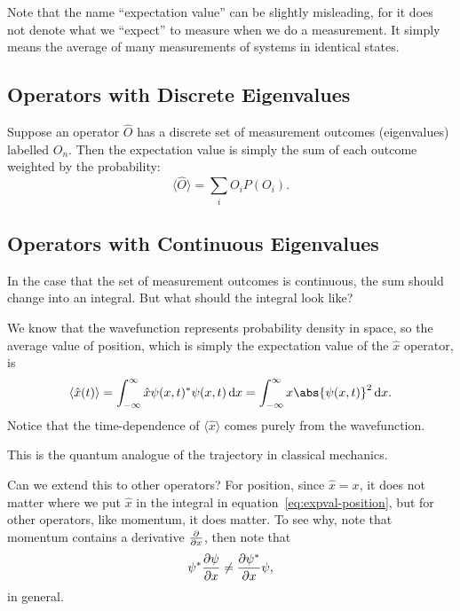 \documentclass[../quantum_mechanics.tex]{subfiles}
\begin{document}
        Note that the name ``expectation value'' can be slightly misleading, for it does not denote what we ``expect'' to measure when we do a measurement.
        It simply means the average of many measurements of systems in identical states.
        
        \subsection{Operators with Discrete Eigenvalues}\label{subsec:operators-with-discrete-eigenvalues}
            Suppose an operator $\hat{O}$ has a discrete set of measurement outcomes (eigenvalues) labelled $O_n$.
            Then the expectation value is simply the sum of each outcome weighted by the probability:
            \begin{equation}\label{eq:operator-expval-discrete}
                \langle\hat{O}\rangle=\sum_i O_i P(O_i).
            \end{equation}

        \subsection{Operators with Continuous Eigenvalues}\label{subsec:operators-with-continuous-eigenvalues}
            In the case that the set of measurement outcomes is continuous, the sum should change into an integral.
            But what should the integral look like?

            We know that the wavefunction represents probability density in space, so the average value of position, which is simply the expectation value of the $\hat{x}$ operator, is
            \begin{equation}\label{eq:expval-position}
                \langle\hat{x}(t)\rangle=\int_{-\infty}^\infty\hat{x}\psi(x,t)^\ast\psi(x,t)\dd{x}=\int_{-\infty}^\infty x\abs{\psi(x,t)}^2\dd{x}.
            \end{equation}
            Notice that the time-dependence of $\langle\hat{x}\rangle$ comes purely from the wavefunction.
            
            This is the quantum analogue of the trajectory in classical mechanics.
        
            Can we extend this to other operators?
            For position, since $\hat{x}=x$, it does not matter where we put $\hat{x}$ in the integral in equation~\ref{eq:expval-position}, but for other operators, like momentum, it does matter.
            To see why, note that momentum contains a derivative $\pdv{}{x}$, then note that
            \begin{equation}
                \psi^\ast\pdv{\psi}{x}\neq\pdv{\psi^\ast}{x}\psi,
            \end{equation}
            in general.
\end{document}
